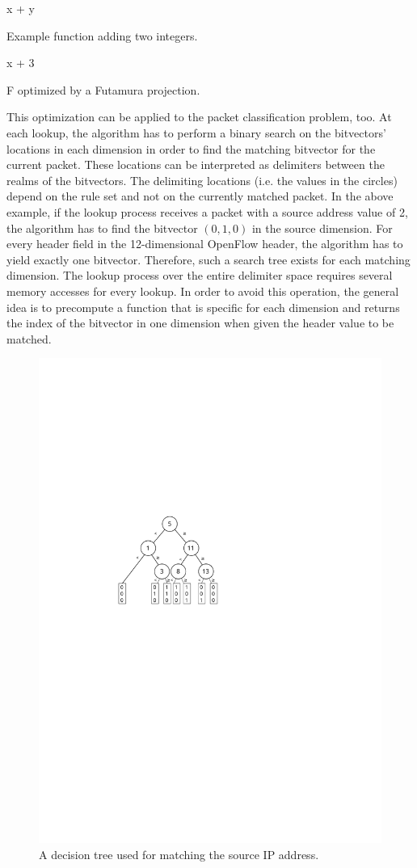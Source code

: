 \documentclass[conference]{IEEEtran}
\begin{document}
\begin{algorithm}
\begin{algorithmic}[1]
    \State \Return x + y
\EndFunction
\end{algorithmic}
\caption{Example function adding two integers.}
\label{alg:futamura-f}
\end{algorithm}

\vspace{-0.5cm}

\begin{algorithm}
\begin{algorithmic}[1]
    \State \Return x + 3
\EndFunction
\end{algorithmic}
\caption{F optimized by a Futamura projection.}
\label{alg:futamura-f-optimized}
\end{algorithm}

This optimization can be applied to the packet classification problem, too.
At each lookup, the algorithm has to perform a binary search on the bitvectors' 
locations in each dimension in order to find the matching bitvector for the current packet.
These locations can be interpreted as delimiters between the realms of the bitvectors.
The delimiting locations (i.e. the values in the circles) depend on the 
rule set and not on the currently matched packet.
In the above example, if the lookup process receives a packet with a source
address value of 2, the algorithm has to find the bitvector $(0, 1, 0)$ in the source dimension.
For every header field in the 12-dimensional OpenFlow header, the algorithm has to yield exactly one bitvector.
Therefore, such a search tree exists for each matching dimension.
The lookup process over the entire delimiter space requires several memory accesses for every lookup.
In order to avoid this operation, the general idea is to precompute a function that 
is specific for each dimension and returns the index of the bitvector in one 
dimension when given the header value to be matched.

\begin{figure}
\centering
\includegraphics[width=0.42\linewidth]{images/bv-tree-simple}
\caption{A decision tree used for matching the source IP address.}
\label{fig:bv-tree}
\end{figure}
\end{document}

